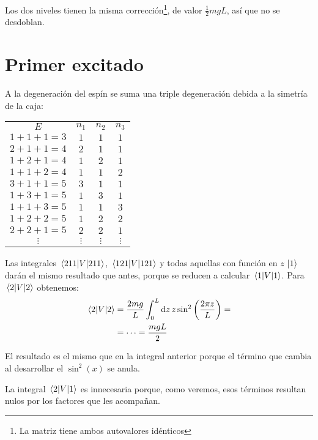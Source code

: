 Los dos niveles tienen la misma corrección\footnote{La matriz tiene
  ambos autovalores idénticos}, de valor $\frac{1}{2}mgL$, así que no
se desdoblan.

\section*{Primer excitado}
A la degeneración del espín se suma una triple degeneración debida a
la simetría de la caja:

\begin{center}
  \begin{tabular}{c|ccc}
    $E$&$n_1$&$n_2$&$n_3$ \\
    $1+1+1=3$ & $1$ & $1$ & $1$ \\ \hline
    $2+1+1=4$ & $2$ & $1$ & $1$ \\
    $1+2+1=4$ & $1$ & $2$ & $1$ \\ 
    $1+1+2=4$ & $1$ & $1$ & $2$ \\ \hline
    $3+1+1=5$ & $3$ & $1$ & $1$ \\
    $1+3+1=5$ & $1$ & $3$ & $1$ \\
    $1+1+3=5$ & $1$ & $1$ & $3$ \\
    $1+2+2=5$ & $1$ & $2$ & $2$ \\
    $2+2+1=5$ & $2$ & $2$ & $1$ \\ \hline
    $\vdots$ & $\vdots$ & $\vdots$ & $\vdots$ \\ 
  \end{tabular}
\end{center}

Las integrales $\ev{V}{211}$, $\ev{V}{121}$ y todas aquellas con
función en $z$ $\ket{1}$ darán el mismo
resultado que antes, porque se
reducen a calcular $\ev{V}{1}$. Para $\ev{V}{2}$
obtenemos:
\begin{equation}
  \begin{split}
    \ev{V}{2} &= \frac{2mg}{L}\int_0^L \dd{z} z \sin^2 \left(
      \frac{2\pi
        z}{L} \right) = \\
    &= \cdots = \frac{mgL}{2}
  \end{split}
\end{equation}

El resultado es el mismo que en la integral anterior porque el término
que cambia al desarrollar el $\sin^2(x)$ se anula.

La integral $\mel{2}{V}{1}$ es innecesaria porque, como veremos, esos términos resultan nulos por los factores que les acompañan.

